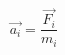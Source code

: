 \documentclass{article}
\begin{document}
\begin{equation*}
\vec{a_i} = \frac{\vec{F_i}}{m_i}
\end{equation*}
\end{document}
